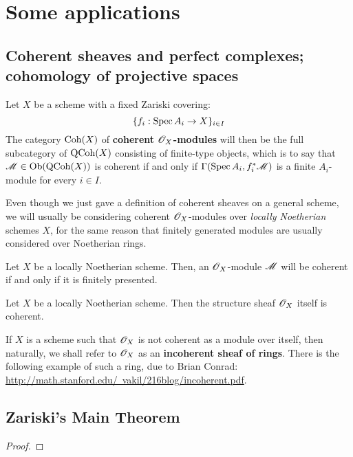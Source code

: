 \section{Some applications}
    \subsection{Coherent sheaves and perfect complexes; cohomology of projective spaces}
        \begin{definition} \label{def: coherent_modules}
            Let $X$ be a scheme with a fixed Zariski covering:
                $$\{ f_i: \operatorname{Spec} A_i \to X \}_{i \in I}$$
            The category $\mathrm{Coh}(X)$ of \textbf{coherent $\mathscr{O}_X$-modules} will then be the full subcategory of $\mathrm{QCoh}(X)$ consisting of finite-type objects, which is to say that $\mathscr{M} \in \mathrm{Ob}( \mathrm{QCoh}(X) )$ is coherent if and only if $\Gamma(\operatorname{Spec} A_i, f_i^*\mathscr{M})$ is a finite $A_i$-module for every $i \in I$.
        \end{definition}
        Even though we just gave a definition of coherent sheaves on a general scheme, we will usually be considering coherent $\mathscr{O}_X$-modules over \textit{locally Noetherian} schemes $X$, for the same reason that finitely generated modules are usually considered over Noetherian rings. 
        \begin{proposition} \label{prop: coherent_modules_over_noetherian_schemes}
            Let $X$ be a locally Noetherian scheme. Then, an $\mathscr{O}_X$-module $\mathscr{M}$ will be coherent if and only if it is finitely presented.
        \end{proposition}
        \begin{example}
            Let $X$ be a locally Noetherian scheme. Then the structure sheaf $\mathscr{O}_X$ itself is coherent. 
        \end{example}
        \begin{example}
            If $X$ is a scheme such that $\mathscr{O}_X$ is not coherent as a module over itself, then naturally, we shall refer to $\mathscr{O}_X$ as an \textbf{incoherent sheaf of rings}. There is the following example of such a ring, due to Brian Conrad: \href{http://math.stanford.edu/~vakil/216blog/incoherent.pdf}{http://math.stanford.edu/~vakil/216blog/incoherent.pdf}.
        \end{example}

    \subsection{Zariski's Main Theorem}
        \begin{theorem} \label{theorem: formal_function_theorem}

        \end{theorem}
            \begin{proof}
                
            \end{proof}

